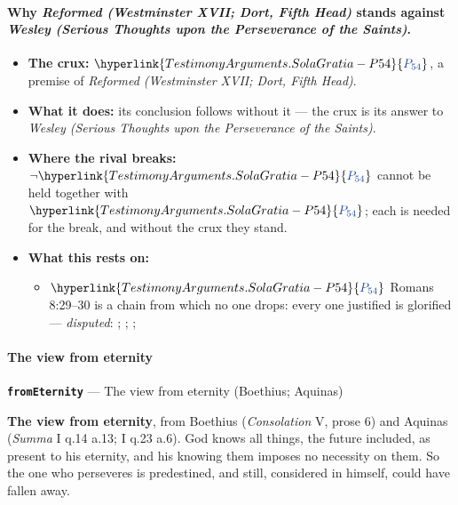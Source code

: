 \documentclass[11pt]{article}
\newcommand{\pvar}[2]{\hyperlink{#1-P#2}{\textcolor{claimlink}{P_{#2}}}}
\begin{document}
\paragraph{Why \emph{Reformed (Westminster XVII; Dort, Fifth Head)} stands against \emph{Wesley (Serious Thoughts upon the Perseverance of the Saints)}.}
\begin{itemize}
\item \textbf{The crux:} \(\pvar{TestimonyArguments.SolaGratia}{54}\), a premise of \emph{Reformed (Westminster XVII; Dort, Fifth Head)}.
\item \textbf{What it does:} its conclusion follows without it --- the crux is its answer to \emph{Wesley (Serious Thoughts upon the Perseverance of the Saints)}.
\item \textbf{Where the rival breaks:} \(\lnot \pvar{TestimonyArguments.SolaGratia}{54}\) cannot be held together with \(\pvar{TestimonyArguments.SolaGratia}{54}\); each is needed for the break, and without the crux they stand.
\item \textbf{What this rests on:}
\begin{itemize}
\item \(\pvar{TestimonyArguments.SolaGratia}{54}\) Romans 8:29–30 is a chain from which no one drops: every one justified is glorified --- \emph{disputed}: \cite[582--583]{schaff-creeds-christendom-3-1977}; \cite[557]{schaff-creeds-christendom-3-1977}; \cite[384]{wesley-explanatory-notes-nt}; \cite[413]{wesley-works-9-1827}
\end{itemize}
\end{itemize}
\paragraph*{The view from eternity}
\leavevmode\par\nobreak
\par\medskip\noindent\textbf{\texttt{from\allowbreak{}Eternity}} --- The view from eternity (Boethius; Aquinas)\par\nobreak\noindent
\textbf{The view from eternity}, from Boethius (\emph{Consolation} V, prose 6) and Aquinas (\emph{Summa} I q.14 a.13; I q.23 a.6). God knows all things, the future included, as present to his eternity, and his knowing them imposes no necessity on them. So the one who perseveres is predestined, and still, considered in himself, could have fallen away.
\end{document}
